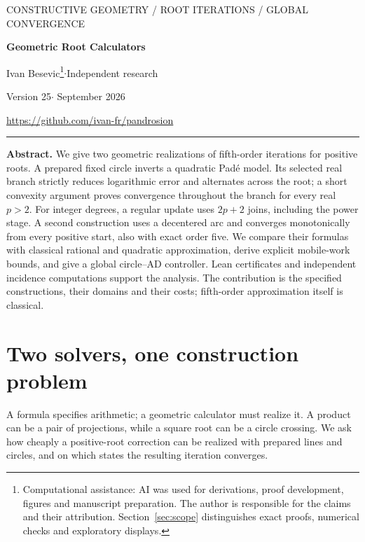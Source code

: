 \documentclass[11pt,a4paper]{article}
\begin{document}
\thispagestyle{empty}
{\small\sffamily\color{accent} CONSTRUCTIVE GEOMETRY / ROOT ITERATIONS / GLOBAL CONVERGENCE}\par
\vspace{8pt}
{\fontsize{24}{27}\selectfont\bfseries\color{ink} Geometric Root Calculators\par}
\vspace{5pt}{\large Two fifth-order solvers and their construction cost}\par
\vspace{9pt}Ivan Besevic\footnote{Computational assistance: AI was used for derivations, proof development, figures and manuscript preparation. The author is responsible for the claims and their attribution. Section~\ref{sec:scope} distinguishes exact proofs, numerical checks and exploratory displays.}\quad$\cdot$\quad Independent research\par
{\small Version 25\quad$\cdot$ September 2026}\par
\url{https://github.com/ivan-fr/pandrosion}
\vspace{8pt}\hrule\vspace{8pt}
\textbf{Abstract.}
We give two geometric realizations of fifth-order iterations for positive roots. A prepared fixed circle inverts a quadratic Pad\'e model. Its selected real branch strictly reduces logarithmic error and alternates across the root; a short convexity argument proves convergence throughout the branch for every real $p>2$. For integer degrees, a regular update uses $2p+2$ joins, including the power stage. A second construction uses a decentered arc and converges monotonically from every positive start, also with exact order five. We compare their formulas with classical rational and quadratic approximation, derive explicit mobile-work bounds, and give a global circle--AD controller. Lean certificates and independent incidence computations support the analysis. The contribution is the specified constructions, their domains and their costs; fifth-order approximation itself is classical.

\section{Two solvers, one construction problem}
A formula specifies arithmetic; a geometric calculator must realize it. A product can be a pair of projections, while a square root can be a circle crossing. We ask how cheaply a positive-root correction can be realized with prepared lines and circles, and on which states the resulting iteration converges.
\end{document}
